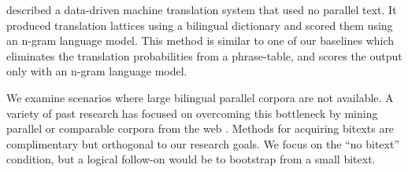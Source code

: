 \documentclass[11pt]{article}
\newcommand{\todo}[1]{\textcolor{red}{TODO: #1}}
\newcommand{\todop}[2]{\noindent\textcolor{red}{TODO for #1:} #2\\}
\begin{document}
 described a data-driven machine translation system that used no parallel text. It produced translation lattices using a bilingual dictionary and scored them using an n-gram language model.  This method is similar to one of our baselines which eliminates the translation probabilities from a phrase-table, and scores the output only with an n-gram language model.  

We examine scenarios where large bilingual parallel corpora are not available.  A variety of past research has focused on overcoming this bottleneck by mining parallel or comparable corpora from the web \cite{Munteanu:2006,Schwenk2008,Rauf2009,Smith2010,Uszkoreit:2010}.  Methods for acquiring bitexts are complimentary but orthogonal to our research goals.  We focus on the ``no bitext'' condition, but a logical follow-on would be to bootstrap from a small bitext.



\end{document}
